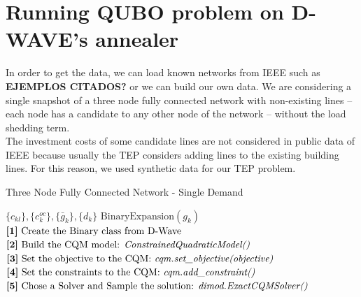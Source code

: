 \section{Running QUBO problem on D-WAVE's annealer}
In order to get the data, we can load known networks from IEEE such as \textbf{EJEMPLOS CITADOS?} or we can build our own data. We are considering a single snapshot of a three node fully connected network with non-existing lines -- each node has a candidate to any other node of the network -- without the load shedding term.\\
The investment costs of some candidate lines are not considered in public data of IEEE because usually the TEP considers adding lines to the existing building lines. For this reason, we used synthetic data for our TEP problem.
\begin{algorithm}
\caption{Three Node Fully Connected Network - Single Demand}\label{alg:threenode}
\begin{algorithmic}
\Require $\{c_{kl}\},\{c_{k}^{oc}\}, \{\bar{g}_{k}\}, \{d_{k}\}$ 
\Ensure $\text{BinaryExpansion}(g_{k})$
\State $\text{\textbf{[1]} Create the Binary class from D-Wave}$
\State $\text{\textbf{[2]} Build the CQM model: \textit{ConstrainedQuadraticModel()}}$
\State $\text{\textbf{[3]} Set the objective to the CQM: \textit{cqm.set\_objective(objective)}}$
\State $\text{\textbf{[4]} Set the constraints to the CQM: \textit{cqm.add\_constraint()}}$
\State $\text{\textbf{[5]} Chose a Solver and Sample the solution: \textit{dimod.ExactCQMSolver()}}$
\end{algorithmic}
\end{algorithm}
